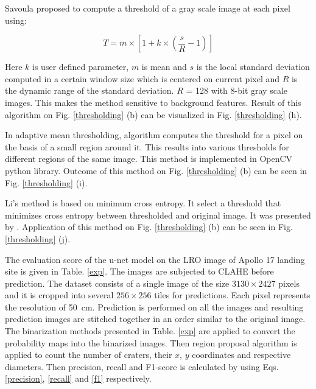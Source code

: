 \documentclass[11pt]{article}
\begin{document}
Savoula proposed to compute a threshold of a gray scale image at each pixel using:

\begin{equation}
T=m \times\left[1+k \times\left(\frac{s}{R}-1\right)\right]
\end{equation}

Here $k$ is user defined parameter, $m$ is mean and $s$ is the local standard deviation computed in a certain window size which is centered on current pixel and $R$ is the dynamic range of the standard deviation. $R$ = 128 with 8-bit gray scale images. This makes the method sensitive to background features. Result of this algorithm on Fig. \ref{thresholding} (b) can be visualized in Fig. \ref{thresholding} (h).

In adaptive mean thresholding, algorithm computes the threshold for a pixel on the basis of a small region around it. This results into various thresholds for different regions of the same image. This method is implemented in OpenCV python library. Outcome of this method on Fig. \ref{thresholding} (b) can be seen in Fig. \ref{thresholding} (i).

Li's method is based on minimum cross entropy. It select a threshold that minimizes cross entropy between thresholded and original image. It was presented by \cite{li1993minimum}. Application of this method on Fig. \ref{thresholding} (b) can be seen in Fig. \ref{thresholding} (j).

The evaluation score of the u-net model on the LRO image of Apollo 17 landing site is given in Table. \ref{exp}. The images are subjected to CLAHE before prediction. The dataset consists of a single image of the size $3130 \times 2427$ pixels and it is cropped into several $256 \times 256$ tiles for predictions. Each pixel represents the resolution of \SI{50}{cm}. Prediction is performed on all the images and resulting prediction images are stitched together in an order similar to the original image. The binarization methods presented in Table. \ref{exp} are applied to convert the probability maps into the binarized images. Then region proposal algorithm is applied to count the number of craters, their $x$, $y$ coordinates and respective diameters. Then precision, recall and F1-score is calculated by using Eqs. \ref{precision}, \ref{recall} and \ref{f1} respectively. 
\end{document}
